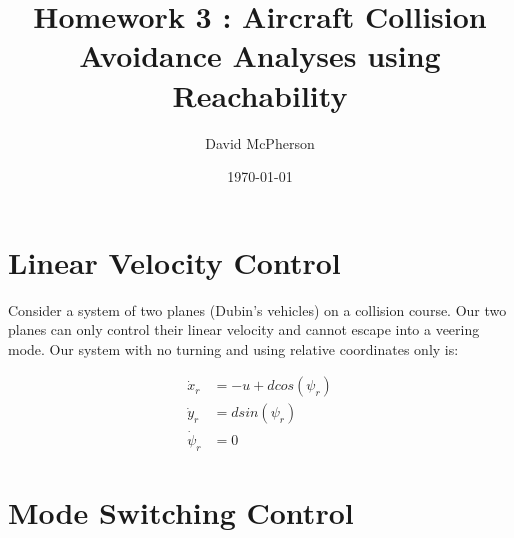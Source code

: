 \documentclass[a4paper]{article}
\title{Homework 3 : Aircraft Collision Avoidance Analyses using Reachability}
\author{David McPherson}
\date{\today}
\begin{document}
\maketitle

\section{Linear Velocity Control}
Consider a system of two planes (Dubin's vehicles) on a collision course.
Our two planes can only control their linear velocity and cannot escape into a veering mode.
Our system with no turning and using relative coordinates only is:

\begin{align*}
     \dot{x}_r    &= -u + d cos(\psi_r)
  \\ \dot{y}_r    &=  d sin(\psi_r)
  \\ \dot{\psi}_r &=  0
\end{align*}

\section{Mode Switching Control}
\end{document}
